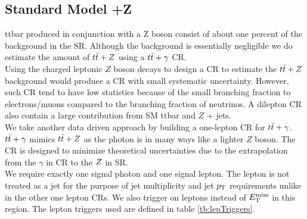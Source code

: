 \subsection{Standard Model \ttbar+Z}
\label{sec:Bkg:ttV}

\indent ttbar produced in conjunction with a Z boson consist of about one percent of the background in the SR.  Although the background is essentially negligible we do estimate the amount of $t\bar{t}+Z$ using a $t\bar{t}+\gamma$ CR. \\

\indent Using the charged leptonic $Z$ boson decays to design a CR to estimate the $t\bar{t}+Z$ background would produce a CR with small systematic uncertainty. However, such CR tend to have low statistics because of the small branching fraction to electrons/muons compared to the branching fraction of neutrinos.  A dilepton CR also contain a large contribution from SM ttbar and $Z$ + jets. \\

\indent We take another data driven approach by building a one-lepton CR for $t\bar{t}+\gamma$.  $t\bar{t}+\gamma$ mimics $t\bar{t}+Z$ as the photon is in many ways like a lighter $Z$ boson.  The CR is designed to minimize theoretical uncertainties due to the extrapolation from the $\gamma$ in CR to the $Z$ in SR. \\

\indent We require exactly one signal photon and one signal lepton.  The lepton is not treated as a jet for the purpose of jet multiplicity and jet $p_{\mathrm{T}}$ requirements unlike in the other one lepton CRs.  We also trigger on leptons instead of $E_{\mathrm{T}}^{\mathrm{miss}}$ in this region. The lepton triggers used are defined in table \ref{tb:lepTriggers}.  \\

